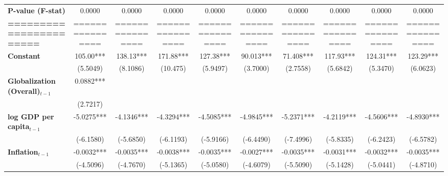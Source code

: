 \begin{center}
\begin{tabular}{lccccccccc}
\textbf{P-value (F-stat)}          &       0.0000       &       0.0000       &       0.0000       &       0.0000       &       0.0000       &       0.0000       &       0.0000       &       0.0000       &       0.0000        \\
\textbf{=======================}   &  ================  &  ================  &  ================  &  ================  &  ================  &  ================  &  ================  &  ================  &  ================   \\
\textbf{Constant}                     &     105.00***      &     138.13***      &     171.88***      &     127.38***      &     90.013***      &     71.408***      &     117.93***      &     124.31***      &     123.29***       \\
\textbf{ }                         &      (5.5049)      &      (8.1086)      &      (10.475)      &      (5.9497)      &      (3.7000)      &      (2.7558)      &      (5.6842)      &      (5.3470)      &      (6.0623)       \\
\textbf{Globalization (Overall)$_{t-1}$}               &     0.0882***      &                    &                    &                    &                    &                    &                    &                    &                     \\
\textbf{ }                         &      (2.7217)      &                    &                    &                    &                    &                    &                    &                    &                     \\
\textbf{log GDP per capita$_{t-1}$}           &     -5.0275***     &     -4.1346***     &     -4.3294***     &     -4.5085***     &     -4.9845***     &     -5.2371***     &     -4.2119***     &     -4.5606***     &     -4.8930***      \\
\textbf{ }                         &     (-6.1580)      &     (-5.6850)      &     (-6.1193)      &     (-5.9166)      &     (-6.4490)      &     (-7.4996)      &     (-5.8335)      &     (-6.2423)      &     (-6.5782)       \\
\textbf{Inflation$_{t-1}$}      &     -0.0032***     &     -0.0035***     &     -0.0038***     &     -0.0035***     &     -0.0027***     &     -0.0035***     &     -0.0031***     &     -0.0032***     &     -0.0035***      \\
\textbf{ }                         &     (-4.5096)      &     (-4.7670)      &     (-5.1365)      &     (-5.0580)      &     (-4.6079)      &     (-5.5090)      &     (-5.1428)      &     (-5.0441)      &     (-4.8710)       \\

\end{tabular}
\end{center}
